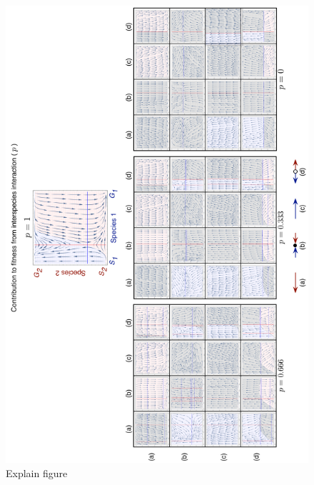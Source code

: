 \documentclass{pnastwo}
\begin{document}
\begin{article}
\begin{figure}[h]
\begin{center}
\includegraphics[width=1.5\columnwidth]{../Figures/Dynamicsacrossp_reduced.pdf}
\caption{
Explain figure
}
\end{center}
\end{figure}


\end{article}
\end{document}
